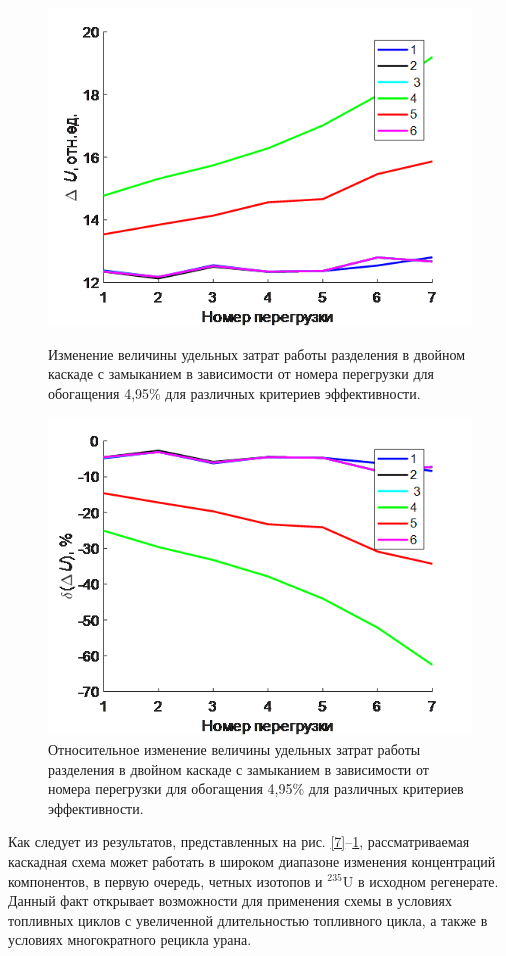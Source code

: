 \begin{figure}[ht]
    \begin{minipage}{.5\textwidth}
      \centering
      \includegraphics[width=.8\linewidth]{images/net/12}  
      \caption{Изменение величины удельных затрат работы разделения в двойном каскаде с замыканием в зависимости от номера перегрузки для обогащения 4,95\% для различных критериев эффективности.}
      \label{12}
    \end{minipage}
    \begin{minipage}{.5\textwidth}
      \centering
      \includegraphics[width=.8\linewidth]{images/net/13}  
      \caption{Относительное изменение величины удельных затрат работы разделения в двойном каскаде с замыканием в зависимости от номера перегрузки для обогащения 4,95\% для различных критериев эффективности.}
      \label{13}
    \end{minipage}
\end{figure}


Как следует из результатов, представленных на рис. \ref{7}–\ref{13}, рассматриваемая каскадная схема может работать в широком диапазоне изменения концентраций компонентов, в первую очередь, четных изотопов и $^{235}$U в исходном регенерате. Данный факт открывает возможности для применения схемы в условиях топливных циклов с увеличенной длительностью топливного цикла, а также в условиях многократного рецикла урана.

